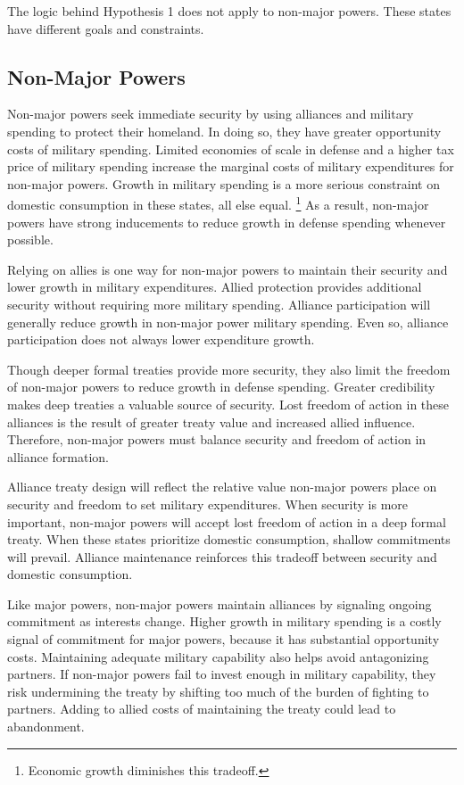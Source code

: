 \documentclass[12pt]{article}
\begin{document}
The logic behind Hypothesis 1 does not apply to non-major powers. 
These states have different goals and constraints. 


\subsection{Non-Major Powers} 


Non-major powers seek immediate security by using alliances and military spending to protect their homeland.  
In doing so, they have greater opportunity costs of military spending. 
Limited economies of scale in defense and a higher tax price of military spending increase the marginal costs of military expenditures for non-major powers. 
Growth in military spending is a more serious constraint on domestic consumption in these states, all else equal.
\footnote{Economic growth diminishes this tradeoff.} 
As a result, non-major powers have strong inducements to reduce growth in defense spending whenever possible.


Relying on allies is one way for non-major powers to maintain their security and lower growth in military expenditures.  
Allied protection provides additional security without requiring more military spending. 
Alliance participation will generally reduce growth in non-major power military spending. 
Even so, alliance participation does not always lower expenditure growth.
 


Though deeper formal treaties provide more security, they also limit the freedom of non-major powers to reduce growth in defense spending.
Greater credibility makes deep treaties a valuable source of security. 
Lost freedom of action in these alliances is the result of greater treaty value and increased allied influence. 
Therefore, non-major powers must balance security and freedom of action in alliance formation. 


Alliance treaty design will reflect the relative value non-major powers place on security and freedom to set military expenditures. 
When security is more important, non-major powers will accept lost freedom of action in a deep formal treaty.
When these states prioritize domestic consumption, shallow commitments will prevail. 
Alliance maintenance reinforces this tradeoff between security and domestic consumption. 


Like major powers, non-major powers maintain alliances by signaling ongoing commitment as interests change. 
Higher growth in military spending is a costly signal of commitment for major powers, because it has substantial opportunity costs. 
Maintaining adequate military capability also helps avoid antagonizing partners. 
If non-major powers fail to invest enough in military capability, they risk undermining the treaty by shifting too much of the burden of fighting to partners. 
Adding to allied costs of maintaining the treaty could lead to abandonment. 
\end{document}

